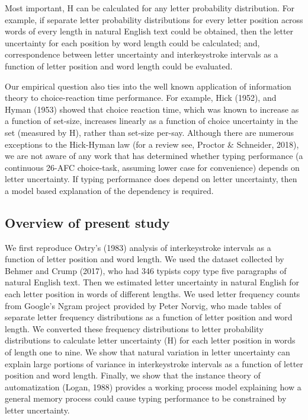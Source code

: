 \documentclass[,man,floatsintext]{apa6}
\begin{document}
Most important, H can be calculated for any letter probability distribution. For example, if separate letter probability distributions for every letter position across words of every length in natural English text could be obtained, then the letter uncertainty for each position by word length could be calculated; and, correspondence between letter uncertainty and interkeystroke intervals as a function of letter position and word length could be evaluated.

Our empirical question also ties into the well known application of information theory to choice-reaction time performance. For example, Hick (1952), and Hyman (1953) showed that choice reaction time, which was known to increase as a function of set-size, increases linearly as a function of choice uncertainty in the set (measured by H), rather than set-size per-say. Although there are numerous exceptions to the Hick-Hyman law (for a review see, Proctor \& Schneider, 2018), we are not aware of any work that has determined whether typing performance (a continuous 26-AFC choice-task, assuming lower case for convenience) depends on letter uncertainty. If typing performance does depend on letter uncertainty, then a model based explanation of the dependency is required.

\hypertarget{overview-of-present-study}{%
\subsection{Overview of present study}\label{overview-of-present-study}}

We first reproduce Ostry's (1983) analysis of interkeystroke intervals as a function of letter position and word length. We used the dataset collected by Behmer and Crump (2017), who had 346 typists copy type five paragraphs of natural English text. Then we estimated letter uncertainty in natural English for each letter position in words of different lengths. We used letter frequency counts from Google's Ngram project provided by Peter Norvig, who made tables of separate letter frequency distributions as a function of letter position and word length. We converted these frequency distributions to letter probability distributions to calculate letter uncertainty (H) for each letter position in words of length one to nine. We show that natural variation in letter uncertainty can explain large portions of variance in interkeystroke intervals as a function of letter position and word length. Finally, we show that the instance theory of automatization (Logan, 1988) provides a working process model explaining how a general memory process could cause typing performance to be constrained by letter uncertainty.
\end{document}
